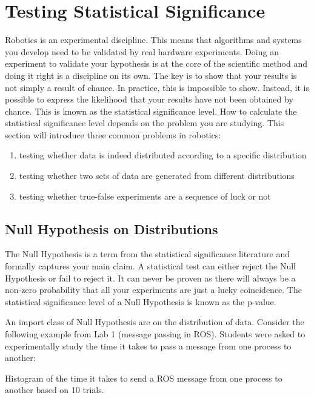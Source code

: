 \section{Testing Statistical Significance}\label{sec:stattest}
Robotics is an experimental discipline. This means that algorithms and systems you develop need to be validated by real hardware experiments. Doing an experiment to validate your hypothesis is at the core of the scientific method and doing it right is a discipline on its own. The key is to show that your results is not simply a result of chance. In practice, this is impossible to show. Instead, it is possible to express the likelihood that your results have not been obtained by chance. This is known as the statistical significance level. How to calculate the statistical significance level depends on the problem you are studying. This section will introduce three common problems in robotics:

\begin{enumerate}
\item testing whether data is indeed distributed according to a specific distribution
\item testing whether two sets of data are generated from different distributions
\item testing whether true-false experiments are a sequence of luck or not
\end{enumerate}

\subsection{Null Hypothesis on Distributions}
The Null Hypothesis is a term from the statistical significance literature and formally captures your main claim. A statistical test can either reject the Null Hypothesis or fail to reject it. It can never be proven as there will always be a non-zero probability that all your experiments are just a lucky coincidence. The statistical significance level of a Null Hypothesis is known as the p-value.

An import class of Null Hypothesis are on the distribution of data. Consider the following example from Lab 1 (message passing in ROS). Students were asked to experimentally study the time it takes to pass a message from one process to another:

\begin{framed}
Histogram of the time it takes to send a ROS message from one process to another based on 10 trials.
\end{framed}

